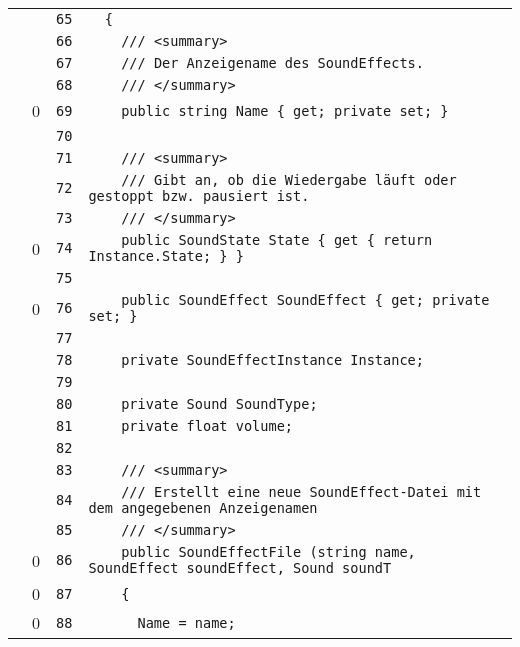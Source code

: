 \documentclass[a4paper,10pt]{article}
\begin{document}
\begin{longtable}[l]{lrrl}
\cellcolor{gray} &  & \verb~65~ & \verb~  {~\\
\cellcolor{gray} &  & \verb~66~ & \verb~    /// <summary>~\\
\cellcolor{gray} &  & \verb~67~ & \verb~    /// Der Anzeigename des SoundEffects.~\\
\cellcolor{gray} &  & \verb~68~ & \verb~    /// </summary>~\\
\cellcolor{red} & 0 & \verb~69~ & \verb~    public string Name { get; private set; }~\\
\cellcolor{gray} &  & \verb~70~ & \verb~~\\
\cellcolor{gray} &  & \verb~71~ & \verb~    /// <summary>~\\
\cellcolor{gray} &  & \verb~72~ & \verb~    /// Gibt an, ob die Wiedergabe läuft oder gestoppt bzw. pausiert ist.~\\
\cellcolor{gray} &  & \verb~73~ & \verb~    /// </summary>~\\
\cellcolor{red} & 0 & \verb~74~ & \verb~    public SoundState State { get { return Instance.State; } }~\\
\cellcolor{gray} &  & \verb~75~ & \verb~~\\
\cellcolor{red} & 0 & \verb~76~ & \verb~    public SoundEffect SoundEffect { get; private set; }~\\
\cellcolor{gray} &  & \verb~77~ & \verb~~\\
\cellcolor{gray} &  & \verb~78~ & \verb~    private SoundEffectInstance Instance;~\\
\cellcolor{gray} &  & \verb~79~ & \verb~~\\
\cellcolor{gray} &  & \verb~80~ & \verb~    private Sound SoundType;~\\
\cellcolor{gray} &  & \verb~81~ & \verb~    private float volume;~\\
\cellcolor{gray} &  & \verb~82~ & \verb~~\\
\cellcolor{gray} &  & \verb~83~ & \verb~    /// <summary>~\\
\cellcolor{gray} &  & \verb~84~ & \verb~    /// Erstellt eine neue SoundEffect-Datei mit dem angegebenen Anzeigenamen ~\\
\cellcolor{gray} &  & \verb~85~ & \verb~    /// </summary>~\\
\cellcolor{red} & 0 & \verb~86~ & \verb~    public SoundEffectFile (string name, SoundEffect soundEffect, Sound soundT~\\
\cellcolor{red} & 0 & \verb~87~ & \verb~    {~\\
\cellcolor{red} & 0 & \verb~88~ & \verb~      Name = name;~\\

\end{longtable}
\end{document}
